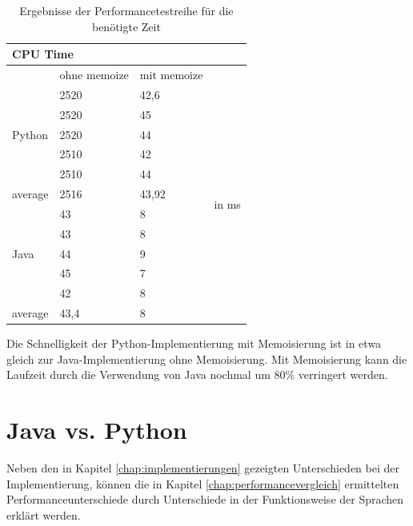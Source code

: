 \begin{table}[H]
    \centering
    \begin{tabular}{|l|ll|l|}
        \hline
        \multicolumn{4}{|l|}{\textbf{CPU Time}}                                        \\ \hline
                                & ohne memoize & mit memoize &                         \\ \hline
        \multirow{5}{*}{Python} & 2520         & 42,6        & \multirow{12}{*}{in ms} \\
                                & 2520         & 45          &                         \\
                                & 2520         & 44          &                         \\
                                & 2510         & 42          &                         \\
                                & 2510         & 44          &                         \\ \cline{1-3}
        average                 & 2516         & 43,92       &                         \\ \cline{1-3}
        \multirow{5}{*}{Java}   & 43           & 8           &                         \\
                                & 43           & 8           &                         \\
                                & 44           & 9           &                         \\
                                & 45           & 7           &                         \\
                                & 42           & 8           &                         \\ \cline{1-3}
        average                 & 43,4         & 8           &                         \\ \hline
    \end{tabular}
    \caption{Ergebnisse der Performancetestreihe für die benötigte Zeit}
\end{table}

Die Schnelligkeit der Python-Implementierung mit Memoisierung ist in etwa gleich zur Java-Implementierung 
ohne Memoisierung. Mit Memoisierung kann die Laufzeit durch die Verwendung von Java nochmal um 80\% verringert 
werden.

\section{Java vs. Python}
Neben den in Kapitel \ref{chap:implementierungen} gezeigten Unterschieden bei der Implementierung, können die in Kapitel 
\ref{chap:performancevergleich} ermittelten Performanceunterschiede durch Unterschiede in der Funktionsweise der 
Sprachen erklärt werden.

